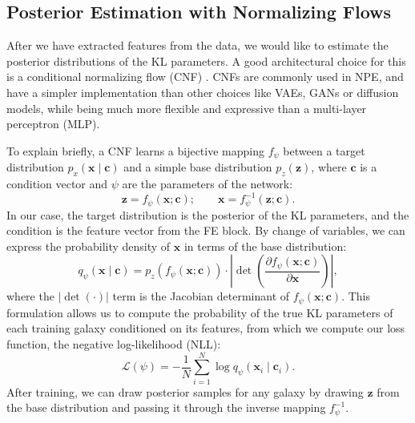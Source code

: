 \subsection{Posterior Estimation with Normalizing Flows}
\label{ssec:npe}
After we have extracted features from the data, we would like to estimate the posterior distributions of the KL parameters. A good architectural choice for this is a conditional normalizing flow (CNF) \citep{NormalizingFlows, CNF}. CNFs are commonly used in NPE, and have a simpler implementation than other choices like VAEs, GANs or diffusion models, while being much more flexible and expressive than a multi-layer perceptron (MLP).

To explain briefly, a CNF learns a bijective mapping $f_\psi$ between a target distribution $p_x(\mathbf{x \mid c})$ and a simple base distribution $p_z(\mathbf{z})$, where $\mathbf{c}$ is a condition vector and $\psi$ are the parameters of the network:
\begin{equation}
\label{eqn:cnf-transform}
    \mathbf{z} = f_\psi(\mathbf{x}; \mathbf{c}); \qquad \mathbf{x} = f_\psi^{-1}(\mathbf{z}; \mathbf{c}).
\end{equation}
In our case, the target distribution is the posterior of the KL parameters, and the condition is the feature vector from the FE block. By change of variables, we can express the probability density of $\mathbf{x}$ in terms of the base distribution:
\begin{equation}
\label{eqn:cnf-cv}
    q_\psi(\mathbf{x \mid c}) = p_z\left(f_\psi(\mathbf{x}; \mathbf{c})\right) \cdot \left| \det\left(\frac{\partial f_\psi(\mathbf{x}; \mathbf{c})}{\partial\mathbf{x}}\right)\right| ,
\end{equation}
where the $ |\det(\cdot)| $ term is the Jacobian determinant of $f_\psi(\mathbf{x}; \mathbf{c})$. This formulation allows us to compute the probability of the true KL parameters of each training galaxy conditioned on its features, from which we compute our loss function, the negative log-likelihood (NLL):
\begin{equation}
\label{eqn:loss-unweighted}
    \mathcal{L}(\psi) = -\frac{1}{N}\sum_{i=1}^N\log q_\psi(\mathbf{x}_i \mid \mathbf{c}_i).
\end{equation}
After training, we can draw posterior samples for any galaxy by drawing $\mathbf{z}$ from the base distribution and passing it through the inverse mapping $f_\psi^{-1}$.

